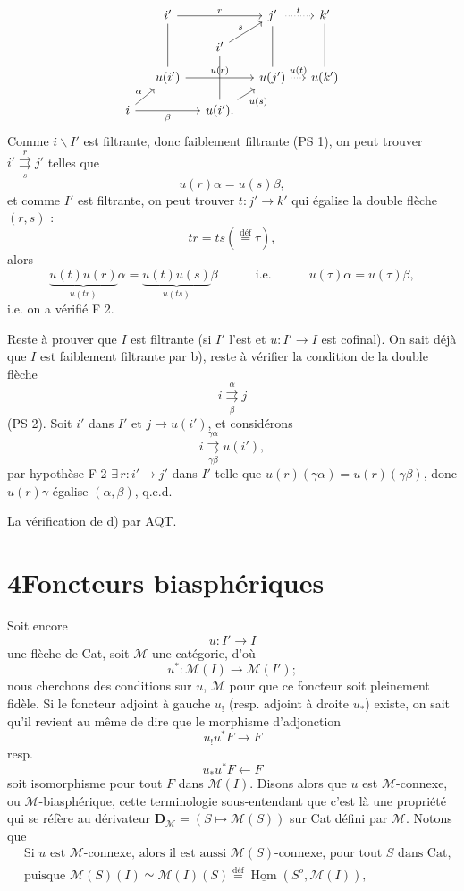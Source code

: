 \documentclass[11pt]{article}
\newcommand{\printedpage}[1]{\marginpar{\footnotesize p.~#1}}
\def\dcprintedpending{}
\newcommand{\msp}[1]{\marginpar{\footnotesize\raggedright
  \ifx\dcprintedpending\empty\else p.~\dcprintedpending\par\fi
  [#1]}\gdef\dcprintedpending{}}
\newcommand{\uHom}{\underline{\operatorname{Hom}}}
\newcommand{\bs}{\backslash}
\newcommand{\cM}{\mathcal{M}}
\newcommand{\dbl}[2]{\mathrel{\overset{#1}{\underset{#2}{\rightrightarrows}}}}
\newcommand{\defeq}{\overset{\text{déf}}{=}}
\begin{document}
\printedpage{31}
\msp{page 48}
\[
\begin{tikzcd}[row sep=small, column sep=small]
& i' \arrow[rr, "r"] \arrow[dd, dash] & & j' \arrow[r, dotted, "t"] \arrow[dd, dash] & k' \arrow[dd, dash] \\
& & i' \arrow[ur, "s"] \arrow[dd, dash] & & \\
& u(i') \arrow[rr, "u(r)"] & & u(j') \arrow[r, dotted, "u(t)"] & u(k') \\
i \arrow[ur, "\alpha"] \arrow[rr, "\beta"'] & & u(i'). \arrow[ur, "u(s)"'] & &
\end{tikzcd}
\]
Comme $i\bs I'$ est filtrante, donc faiblement filtrante (PS 1), on peut trouver $i' \dbl{r}{s} j'$ telles que
\[
u(r)\alpha = u(s)\beta,
\]
et comme $I'$ est filtrante, on peut trouver $t : j' \longrightarrow k'$ qui égalise la double flèche $(r, s)$ :
\[
tr = ts(\defeq \tau),
\]
alors
\[
\underbrace{u(t)u(r)}_{u(tr)}\alpha = \underbrace{u(t)u(s)}_{u(ts)}\beta \qquad\quad \text{i.e.} \qquad\quad u(\tau)\alpha = u(\tau)\beta,
\]
i.e. on a vérifié F 2.

Reste à prouver que $I$ est filtrante (si $I'$ l'est et $u : I' \longrightarrow I$ est cofinal). On sait déjà que $I$ est faiblement filtrante par b), reste à vérifier la condition de la double flèche
\[
i \dbl{\alpha}{\beta} j
\]
(PS 2). Soit $i'$ dans $I'$ et $j \longrightarrow u(i')$, et considérons
\[
i \dbl{\gamma\alpha}{\gamma\beta} u(i'),
\]
par hypothèse F 2 $\exists\, r : i' \longrightarrow j'$ dans $I'$ telle que
\msp{page 49}
$u(r)(\gamma\alpha) = u(r)(\gamma\beta)$, donc $u(r)\gamma$ égalise $(\alpha, \beta)$, q.e.d.

La vérification de d) par AQT.

\printedpage{32}
\section*{4\quad Foncteurs biasphériques}

Soit encore
\[
u : I' \longrightarrow I
\]
une flèche de Cat, soit $\cM$ une catégorie, d'où
\[
u^* : \cM(I) \longrightarrow \cM(I');
\tag*{(4.1)}
\]
nous cherchons des conditions sur $u$, $\cM$ pour que ce foncteur soit pleinement fidèle. Si le foncteur adjoint à gauche $u_!$ (resp. adjoint à droite $u_*$) existe, on sait qu'il revient au même de dire que le morphisme d'adjonction
\[
u_!u^*F \longrightarrow F
\tag*{(4.2)}
\]
resp.
\[
u_*u^*F \longleftarrow F
\tag*{(4.2 bis)}
\]
soit isomorphisme pour tout $F$ dans $\cM(I)$. Disons alors que $u$ est $\cM$-connexe, ou $\cM$-biasphérique, cette terminologie sous-entendant que c'est là une propriété qui se réfère au dérivateur $\mathbf{D}_{\cM} = (S \longmapsto \cM(S))$ sur Cat défini par $\cM$. Notons que
\[
\begin{aligned}
&\text{Si $u$ est $\cM$-connexe, alors il est aussi $\cM(S)$-connexe, pour tout $S$ dans Cat,}\\
&\text{puisque $\cM(S)(I) \simeq \cM(I)(S) \defeq \uHom(S^o, \cM(I))$,}
\end{aligned}
\tag*{(4.3)}
\]
\end{document}
